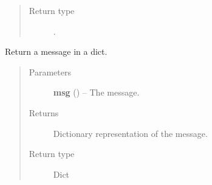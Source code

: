 \documentclass[letterpaper,10pt,english]{sphinxmanual}
\begin{document}
\begin{fulllineitems}
\begin{fulllineitems}
\begin{quote}
\begin{description}
\item[{Return type}] \leavevmode
{\hyperref[swnp:swnp.Message]{}}.

\end{description}\end{quote}

\end{fulllineitems}


\begin{fulllineitems}
\label{swnp:swnp.Message.to_dict}
Return a message in a dict.
\begin{quote}\begin{description}
\item[{Parameters}] \leavevmode
\textbf{msg} ({\hyperref[swnp:swnp.Message]{}}) -- The message.

\item[{Returns}] \leavevmode
Dictionary representation of the message.

\item[{Return type}] \leavevmode
Dict

\end{description}\end{quote}

\end{fulllineitems}


\end{fulllineitems}

\end{document}
